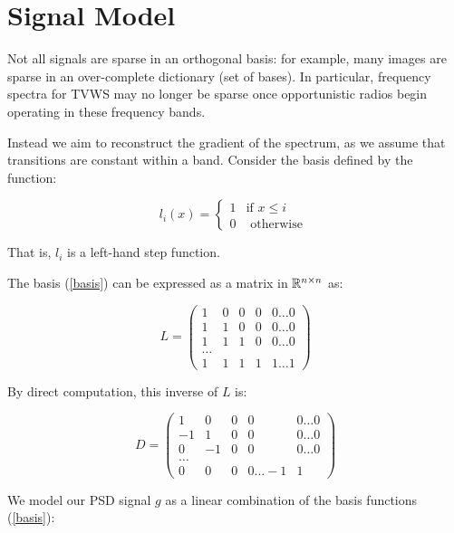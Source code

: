 \section{Signal Model}

Not all signals are sparse in an orthogonal basis: for example, many images are sparse in an over-complete dictionary (set of bases). In particular, frequency spectra for TVWS may no longer be sparse once opportunistic radios begin operating in these frequency bands. 

Instead we aim to reconstruct the gradient of the spectrum, as we assume that transitions are constant within a band. Consider the basis defined by the function:

\begin{equation}
l_i\left(x\right) =
\begin{cases}
1 & \text{if } x \leq i \\
0 & \text{ otherwise } 
\end{cases}
\label{basis}
\end{equation}

That is, \(l_i\) is a left-hand step function. 

The basis (\ref{basis}) can be expressed as a matrix in \({\mathbb{R}}^{n \times n}\) as:

\begin{equation}
L = \begin{pmatrix}
 1 & 0 & 0 & 0  & 0 \ldots 0 \\
  1 & 1 & 0 & 0  & 0 \ldots 0\\
     1 & 1 & 1 & 0  & 0 \ldots0  \\
    \ldots  \\
     1 & 1 & 1 & 1  & 1 \ldots 1 
\end{pmatrix}
\end{equation}

By direct computation, this inverse of \(L\) is:

\begin{equation}
D = \begin{pmatrix}
 1 & 0 & 0 & 0  & 0 \ldots 0 \\
  -1 & 1 & 0 & 0  & 0 \ldots 0\\
     0 & -1 & 0 & 0  & 0 \ldots0  \\
    \ldots  \\
     0 & 0 & 0 & 0  \ldots -1 & 1
\end{pmatrix}
\end{equation}

We model our PSD signal \(g\) as a linear combination of the basis functions (\ref{basis}):

